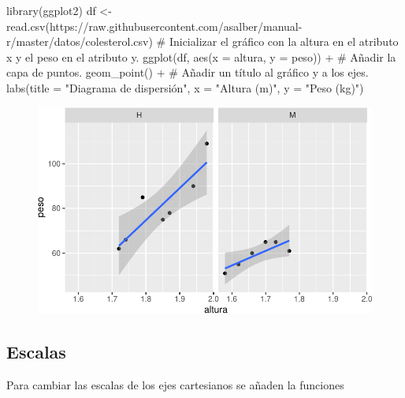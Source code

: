 \documentclass[
  a4paper,
]{scrreport}
\newenvironment{Shaded}{\begin{snugshade}}{\end{snugshade}}
\newcommand{\AttributeTok}[1]{\textcolor[rgb]{0.40,0.45,0.13}{#1}}
\newcommand{\CommentTok}[1]{\textcolor[rgb]{0.37,0.37,0.37}{#1}}
\newcommand{\FunctionTok}[1]{\textcolor[rgb]{0.28,0.35,0.67}{#1}}
\newcommand{\NormalTok}[1]{\textcolor[rgb]{0.00,0.23,0.31}{#1}}
\newcommand{\OtherTok}[1]{\textcolor[rgb]{0.00,0.23,0.31}{#1}}
\newcommand{\SpecialCharTok}[1]{\textcolor[rgb]{0.37,0.37,0.37}{#1}}
\newcommand{\StringTok}[1]{\textcolor[rgb]{0.13,0.47,0.30}{#1}}
\theoremstyle{definition}
\theoremstyle{definition}
\theoremstyle{remark}
\begin{document}
\begin{Shaded}
\begin{Highlighting}[]
\FunctionTok{library}\NormalTok{(ggplot2)}
\NormalTok{df }\OtherTok{\textless{}{-}} \FunctionTok{read.csv}\NormalTok{(}\StringTok{\textquotesingle{}https://raw.githubusercontent.com/asalber/manual{-}r/master/datos/colesterol.csv\textquotesingle{}}\NormalTok{)}
\CommentTok{\# Inicializar el gráfico con la altura en el atributo x y el peso en el atributo y.}
\FunctionTok{ggplot}\NormalTok{(df, }\FunctionTok{aes}\NormalTok{(}\AttributeTok{x =}\NormalTok{ altura, }\AttributeTok{y =}\NormalTok{ peso)) }\SpecialCharTok{+}
\CommentTok{\# Añadir la capa de puntos.}
    \FunctionTok{geom\_point}\NormalTok{() }\SpecialCharTok{+}
\CommentTok{\# Añadir un título al gráfico y a los ejes.}
    \FunctionTok{labs}\NormalTok{(}\AttributeTok{title =} \StringTok{"Diagrama de dispersión"}\NormalTok{, }\AttributeTok{x =} \StringTok{"Altura (m)"}\NormalTok{, }\AttributeTok{y =} \StringTok{"Peso (kg)"}\NormalTok{)}
\end{Highlighting}
\end{Shaded}

\begin{figure}[H]

{\centering \includegraphics{./07-graficos_files/figure-pdf/unnamed-chunk-27-1.pdf}

}

\end{figure}

\hypertarget{escalas}{%
\subsection{Escalas}\label{escalas}}

Para cambiar las escalas de los ejes cartesianos se añaden la funciones
\end{document}
